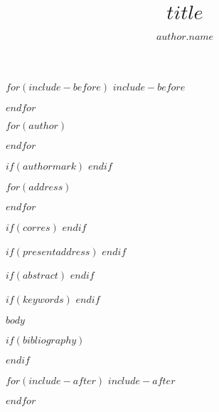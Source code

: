 \documentclass[AMA,STIX1COL,$for(classoption)$$classoption$$sep$,$endfor$]{WileyNJD-v2}
\begin{document}
$for(include-before)$
$include-before$

$endfor$

\title{$title$}

$for(author)$
\author[$author.num$]{$author.name$}
$endfor$

$if(authormark)$
$endif$

$for(address)$
\address[$address.num$]{$address.org$}
$endfor$

$if(corres)$
$endif$

$if(presentaddress)$
$endif$

$if(abstract)$
$endif$

$if(keywords)$
$endif$

\maketitle

$body$

$if(bibliography)$

$endif$

$for(include-after)$
$include-after$

$endfor$
\end{document}
